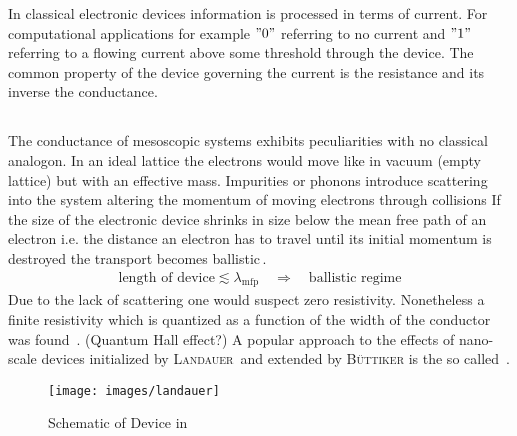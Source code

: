 In classical electronic devices information is processed in terms of current. For computational applications for example $"0"$ referring to no current and $"1"$ referring to a flowing current above some threshold through the device. The common property of the device governing the current is the resistance and its inverse the conductance.
\subsection{\clanbform{}}
The conductance of mesoscopic systems exhibits peculiarities with no classical analogon.  
In an ideal lattice the electrons would move like in vacuum (empty lattice) but with an effective mass. Impurities or phonons introduce scattering into the system altering the momentum of moving electrons through collisions
If the size of the electronic device shrinks in size below the mean free path of an electron i.e. the distance an electron has to travel until its initial momentum is destroyed the transport becomes ballistic\,\cite{datta1989quantum}. 
\begin{align}
	\text{length of device} \lesssim \lambda_{\text{mfp}}\quad \Rightarrow \quad\text{ballistic regime}
	\label{eqn:meanfreepath}
\end{align}
Due to the lack of scattering one would suspect zero resistivity. Nonetheless a finite resistivity which is quantized as a function of the width of the conductor was found \,\cite{PhysRevLett.60.848}.
(Quantum Hall effect?)
A popular approach to the effects of nano-scale devices initialized by \textsc{Landauer}\,\cite{PhilMag.21.863} and extended by \textsc{B\"uttiker} is the so called \lanbform{}\,\cite{PhysRevB.31.6207}.  
\begin{figure}[h]
\centering
\texttt{[image: images/landauer]} 
\caption{Schematic of Device in \lanbform{}}
\label{fig:lanbform}
\end{figure}

